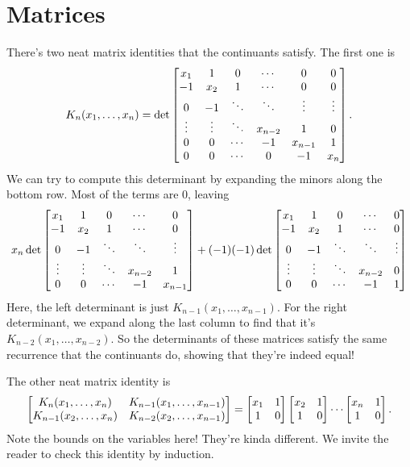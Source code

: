\documentclass[11pt,paper=letter]{scrartcl}
\begin{document}
\section{Matrices}

There's two neat matrix identities that the continuants satisfy. The first one is \[
  K_n(x_1, \ldots, x_n)
  = \det\begin{bmatrix}
  x_1 & 1 & 0 & \cdots & 0 & 0 \\
  -1 & x_2 & 1 & \cdots & 0 & 0 \\
  0 & -1 & \ddots& \ddots & \vdots & \vdots \\
  \vdots & \vdots & \ddots & x_{n-2} & 1 & 0 \\
  0 & 0 & \cdots & -1 & x_{n-1} & 1 \\
  0 & 0 & \cdots & 0 & -1 & x_n
  \end{bmatrix}.
\]
We can try to compute this determinant by expanding the minors along the bottom row. Most of the terms are $0$, leaving \[
  x_n 
  \det\begin{bmatrix}
    x_1 & 1 & 0 & \cdots & 0 \\
    -1 & x_2 & 1 & \cdots & 0 \\
    0 & -1 & \ddots& \ddots & \vdots \\
    \vdots & \vdots & \ddots & x_{n-2} & 1 \\
    0 & 0 & \cdots & -1 & x_{n-1}
  \end{bmatrix}
  + (-1)(-1)\det\begin{bmatrix}
    x_1 & 1 & 0 & \cdots & 0 \\
    -1 & x_2 & 1 & \cdots & 0 \\
    0 & -1 & \ddots& \ddots & \vdots \\
    \vdots & \vdots & \ddots & x_{n-2} & 0 \\
    0 & 0 & \cdots & -1 & 1
  \end{bmatrix}
\]
Here, the left determinant is just $K_{n-1}(x_1, \ldots, x_{n-1})$. For the right determinant, we expand along the last column to find that it's $K_{n-2}(x_1, \ldots, x_{n-2})$. So the determinants of these matrices satisfy the same recurrence that the continuants do, showing that they're indeed equal!

The other neat matrix identity is \[
\begin{bmatrix}
  K_n(x_1, \ldots, x_n) & K_{n-1}(x_1, \ldots, x_{n-1}) \\
  K_{n-1}(x_2, \ldots, x_n) & K_{n-2}(x_2, \ldots, x_{n-1})
\end{bmatrix}
= \begin{bmatrix}x_1 & 1 \\ 1 & 0\end{bmatrix}\begin{bmatrix}x_2 & 1 \\ 1 & 0\end{bmatrix}\cdots\begin{bmatrix}x_n & 1 \\ 1 & 0\end{bmatrix}.
\]
Note the bounds on the variables here! They're kinda different. We invite the reader to check this identity by induction.
\end{document}
